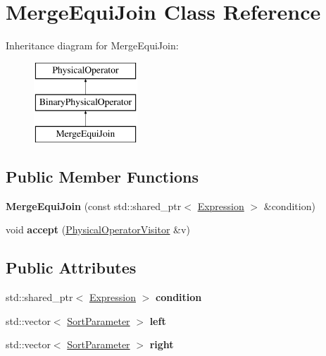 \hypertarget{class_merge_equi_join}{\section{Merge\+Equi\+Join Class Reference}
\label{class_merge_equi_join}
}
Inheritance diagram for Merge\+Equi\+Join\+:\begin{figure}[H]
\begin{center}
\leavevmode
\includegraphics[height=3.000000cm]{class_merge_equi_join}
\end{center}
\end{figure}
\subsection*{Public Member Functions}
\begin{DoxyCompactItemize}
\item 
\hypertarget{class_merge_equi_join_a16fa9f23ebbd531c398b121a99c18afc}{{\bfseries Merge\+Equi\+Join} (const std\+::shared\+\_\+ptr$<$ \hyperlink{class_expression}{Expression} $>$ \&condition)}\label{class_merge_equi_join_a16fa9f23ebbd531c398b121a99c18afc}

\item 
\hypertarget{class_merge_equi_join_a0a88e744444a5a539d58aac25c609a9c}{void {\bfseries accept} (\hyperlink{class_physical_operator_visitor}{Physical\+Operator\+Visitor} \&v)}\label{class_merge_equi_join_a0a88e744444a5a539d58aac25c609a9c}

\end{DoxyCompactItemize}
\subsection*{Public Attributes}
\begin{DoxyCompactItemize}
\item 
\hypertarget{class_merge_equi_join_ac334a1377a90c2876f9a5fad38d1836e}{std\+::shared\+\_\+ptr$<$ \hyperlink{class_expression}{Expression} $>$ {\bfseries condition}}\label{class_merge_equi_join_ac334a1377a90c2876f9a5fad38d1836e}

\item 
\hypertarget{class_merge_equi_join_a10a2e1737a5d7c2e554f55b0e0863d04}{std\+::vector$<$ \hyperlink{class_sort_parameter}{Sort\+Parameter} $>$ {\bfseries left}}\label{class_merge_equi_join_a10a2e1737a5d7c2e554f55b0e0863d04}

\item 
\hypertarget{class_merge_equi_join_a0d32b50a198ce479cae3bbdc52b9766a}{std\+::vector$<$ \hyperlink{class_sort_parameter}{Sort\+Parameter} $>$ {\bfseries right}}\label{class_merge_equi_join_a0d32b50a198ce479cae3bbdc52b9766a}

\end{DoxyCompactItemize}


